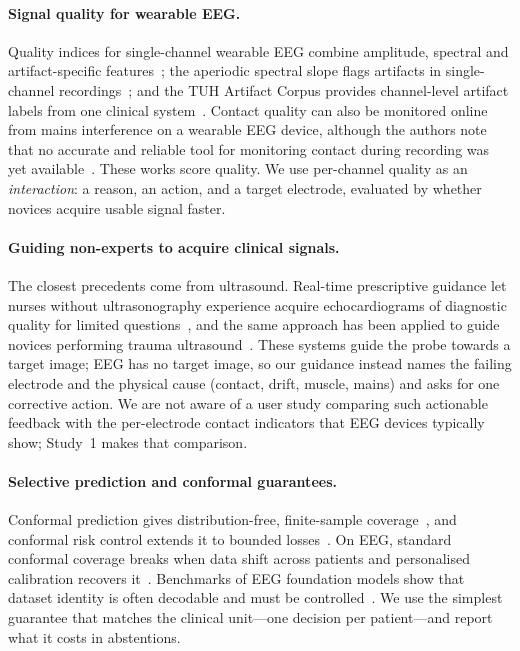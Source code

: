 \documentclass[sigconf,review,anonymous]{acmart}
\begin{document}
\paragraph{Signal quality for wearable EEG.}
Quality indices for single-channel wearable EEG combine amplitude, spectral and artifact-specific features~\cite{grosselin2019}; the aperiodic spectral slope flags artifacts in single-channel recordings~\cite{fasol2023}; and the TUH Artifact Corpus provides channel-level artifact labels from one clinical system~\cite{hamid2020tuar,obeid2016tuh}.
Contact quality can also be monitored online from mains interference on a wearable EEG device, although the authors note that no accurate and reliable tool for monitoring contact during recording was yet available~\cite{casadei2022}.
These works score quality. We use per-channel quality as an \emph{interaction}: a reason, an action, and a target electrode, evaluated by whether novices acquire usable signal faster.

\paragraph{Guiding non-experts to acquire clinical signals.}
The closest precedents come from ultrasound. Real-time prescriptive guidance let nurses without ultrasonography experience acquire echocardiograms of diagnostic quality for limited questions~\cite{narang2021}, and the same approach has been applied to guide novices performing trauma ultrasound~\cite{chiu2023}.
These systems guide the probe towards a target image; EEG has no target image, so our guidance instead names the failing electrode and the physical cause (contact, drift, muscle, mains) and asks for one corrective action. We are not aware of a user study comparing such actionable feedback with the per-electrode contact indicators that EEG devices typically show; Study~1 makes that comparison.

\paragraph{Selective prediction and conformal guarantees.}
Conformal prediction gives distribution-free, finite-sample coverage~\cite{angelopoulos2021gentle}, and conformal risk control extends it to bounded losses~\cite{angelopoulos2022crc}.
On EEG, standard conformal coverage breaks when data shift across patients and personalised calibration recovers it~\cite{chatterjee2026}.
Benchmarks of EEG foundation models show that dataset identity is often decodable and must be controlled~\cite{zare2026}.
We use the simplest guarantee that matches the clinical unit---one decision per patient---and report what it costs in abstentions.
\end{document}
